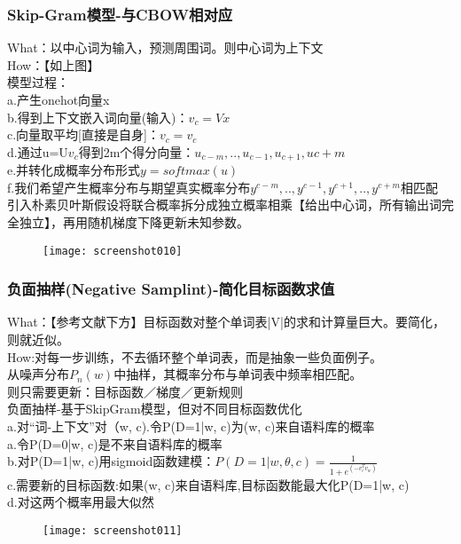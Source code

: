 \documentclass[
10pt, %
a4paper, %
oneside, %
headinclude,footinclude, %
BCOR5mm, %
]{scrartcl}
\begin{document}
\subsubsection{\color{blue}Skip-Gram模型-与CBOW相对应}
What：以中心词为输入，预测周围词。则中心词为上下文
\\How：【如上图】
\\\indent 模型过程：
\\\indent \indent a.产生onehot向量x
\\\indent \indent b.得到上下文嵌入词向量(输入)：$v_c = Vx$
\\\indent \indent c.向量取平均[直接是自身]：$v_c = v_c$
\\\indent \indent d.通过u=U$v_c$得到2m个得分向量：$u_{c-m},..,u_{c-1},u_{c+1},u{c+m}$
\\\indent \indent e.并转化成概率分布形式$y=softmax(u)$
\\\indent \indent f.我们希望产生概率分布与期望真实概率分布$y^{c-m},..,y^{c-1},y^{c+1},..,y^{c+m}$相匹配
\\\indent 引入朴素贝叶斯假设将联合概率拆分成独立概率相乘【给出中心词，所有输出词完全独立】，再用随机梯度下降更新未知参数。
\begin{figure}[!htb]
	\centering
	\texttt{[image: screenshot010]}
	\caption*{}
	\label{fig:screenshot010}
\end{figure}
\subsubsection{\color{blue}负面抽样(Negative Samplint)-简化目标函数求值}
What：【参考文献下方】目标函数对整个单词表|V|的求和计算量巨大。要简化，则就近似。
\\How:对每一步训练，不去循环整个单词表，而是抽象一些负面例子。
\\\indent 从噪声分布$P_n(w)$中抽样，其概率分布与单词表中频率相匹配。
\\\indent 则只需要更新：目标函数／梯度／更新规则
\\负面抽样-基于SkipGram模型，但对不同目标函数优化
\\\indent a.对“词-上下文”对（w, c).令P(D=1|w, c)为(w, c)来自语料库的概率
\\\indent a.令P(D=0|w, c)是不来自语料库的概率
\\\indent b.对P(D=1|w, c)用sigmoid函数建模：$P(D=1|w, \theta, c) = \frac{1}{1+e^{(-v_c^Tv_w)}}$
\\\indent c.需要新的目标函数:如果(w, c)来自语料库,目标函数能最大化P(D=1|w, c)
\\\indent d.对这两个概率用最大似然
\begin{figure}[!htb]
	\centering
	\texttt{[image: screenshot011]}
	\caption*{}
	\label{fig:screenshot011}
\end{figure}
\end{document}
